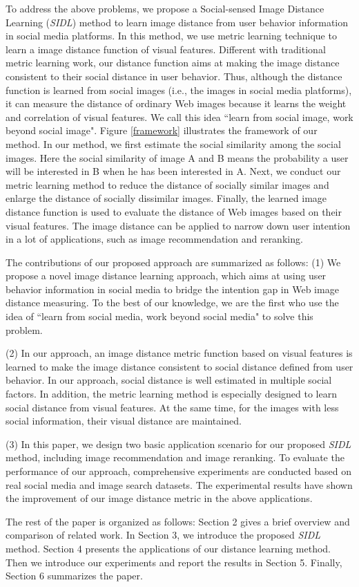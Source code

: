 To address the above problems, we propose a Social-sensed Image Distance Learning (\emph{SIDL}) method to learn image distance from user behavior information in social media platforms. In this method, we use metric learning technique to learn a image distance function of visual features. Different with traditional metric learning work, our distance function aims at making the image distance consistent to their social distance in user behavior. Thus, although the distance function is learned from social images (i.e., the images in social media platforms), it can measure the distance of ordinary Web images because it learns the weight and correlation of visual features. We call this idea ``learn from social image, work beyond social image". Figure \ref{framework} illustrates the framework of our method. In our method, we first estimate the social similarity among the social images. Here the social similarity of image A and B means the probability a user will be interested in B when he has been interested in A. Next, we conduct our metric learning method to reduce the distance of socially similar images and enlarge the distance of socially dissimilar images. Finally, the learned image distance function is used to evaluate the distance of Web images based on their visual features. The image distance can be applied to narrow down user intention in a lot of applications, such as image recommendation and reranking.

The contributions of our proposed approach are summarized as follows:
(1) We propose a novel image distance learning approach, which aims at using user behavior information in social media to bridge the intention gap in Web image distance measuring. To the best of our knowledge, we are the first who use the idea of ``learn from social media, work beyond social media" to solve this problem.

(2) In our approach, an image distance metric function based on visual features is learned to make the image distance consistent to social distance defined from user behavior. In our approach, social distance is well estimated in multiple social factors. In addition, the metric learning method is especially designed to learn social distance from visual features. At the same time, for the images with less social information, their visual distance are maintained.

(3) In this paper, we design two basic application scenario for our proposed \emph{SIDL} method, including image recommendation and image reranking. To evaluate the performance of our approach, comprehensive experiments are conducted based on real social media and image search datasets. The experimental results have shown the improvement of our image distance metric in the above applications.

The rest of the paper is organized as follows: Section 2 gives a brief overview and comparison of related work. In Section 3, we introduce the proposed \emph{SIDL} method. Section 4 presents the applications of our distance learning method. Then we introduce our experiments and report the results in Section 5. Finally, Section 6 summarizes the paper.
